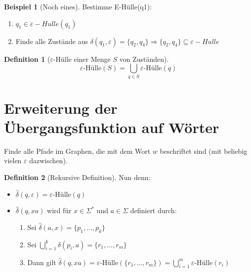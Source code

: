 \documentclass[11pt]{article} %
\theoremstyle{definition}
\newtheorem*{beispiel}{Beispiel}
\newtheorem{definition}{Definition}
\begin{document}
\begin{beispiel}[Noch eines]
Bestimme E-Hülle(q1):
\begin{enumerate}
\item $q_1 \in \varepsilon-Hulle(q_1)$
\item Finde alle Zustände aus $\delta(q_1, \varepsilon) = \{q_2, q_4\} \Rightarrow \{q_2, q_4\} \subseteq \varepsilon-Hulle$
\end{enumerate}

\end{beispiel}

\begin{definition}[$\varepsilon$-Hülle einer Menge $S$ von Zuständen]
\[
\varepsilon\textrm{-Hülle}(S) = \bigcup\limits_{q\in S} \varepsilon\textrm{-Hülle}(q)
\]
\end{definition}

\section{Erweiterung der Übergangsfunktion auf Wörter}

Finde alle Pfade im Graphen, die mit dem Wort $w$ beschriftet sind (mit beliebig vielen $\varepsilon$ dazwischen).

\begin{definition}[Rekursive Definition]
Nun denn:
\begin{itemize}
\item $\hat\delta(q, \varepsilon) = \varepsilon$-Hülle$(q)$
\item $\hat\delta(q, xa)$ wird für $x \in \Sigma^*$  und $a \in \Sigma$ definiert durch:
\begin{enumerate}
\item Sei $\hat\delta(a,x) = \{ p_1, \dots, p_k \}$
\item Sei $\bigcup\limits_{i=1}^k \delta(p_i, a) = \{r_1, \dots, r_m \}$
\item Dann gilt $\hat\delta(q, xa) = \varepsilon$-Hülle$(\{r_1, \dots, r_m\}) = \bigcup\limits_{i=1}^m \varepsilon$-Hülle$(r_i)$
\end{enumerate}
\end{itemize}
\end{definition}
\end{document}
